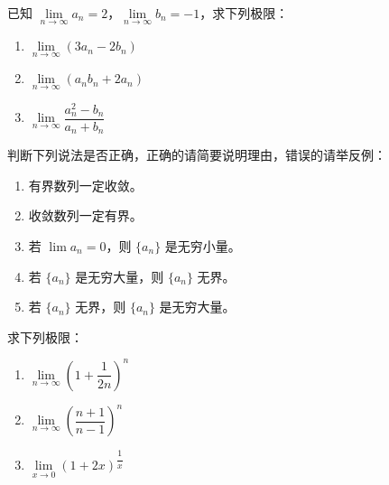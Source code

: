 \documentclass[fontset=fandol]{ctexart}
\begin{document}
\begin{exercise}已知 \(\lim\limits_{n\to\infty} a_n = 2\)，\(\lim\limits_{n\to\infty} b_n = -1\)，求下列极限：

\begin{enumerate}

\item \(\lim\limits_{n\to\infty} (3a_n - 2b_n)\)

\item \(\lim\limits_{n\to\infty} (a_n b_n + 2a_n)\)

\item \(\lim\limits_{n\to\infty} \dfrac{a_n^2 - b_n}{a_n + b_n}\)

\end{enumerate}

\end{exercise}



\begin{exercise}判断下列说法是否正确，正确的请简要说明理由，错误的请举反例：

\begin{enumerate}

\item 有界数列一定收敛。

\item 收敛数列一定有界。

\item 若 \(\lim a_n = 0\)，则 \(\{a_n\}\) 是无穷小量。

\item 若 \(\{a_n\}\) 是无穷大量，则 \(\{a_n\}\) 无界。

\item 若 \(\{a_n\}\) 无界，则 \(\{a_n\}\) 是无穷大量。

\end{enumerate}

\end{exercise}



\begin{exercise}求下列极限：

\begin{enumerate}

\item \(\lim\limits_{n\to\infty} \left(1 + \dfrac{1}{2n}\right)^n\)

\item \(\lim\limits_{n\to\infty} \left(\dfrac{n+1}{n-1}\right)^n\)

\item \(\lim\limits_{x\to 0} (1 + 2x)^{\dfrac{1}{x}}\)

\end{enumerate}

\end{exercise}
\end{document}
